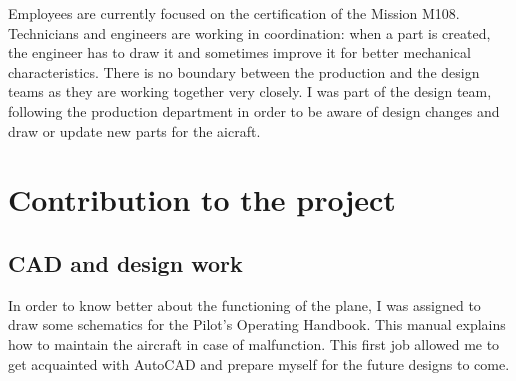 \documentclass[11pt,a4paper]{article}
\begin{document}
\bigskip

Employees are currently focused on the certification of the Mission M108. Technicians and engineers are working in coordination: when a part is created, the engineer has to draw it and sometimes improve it for better mechanical characteristics. There is no boundary between the production and the design teams as they are working together very closely. I was part of the design team, following the production department in order to be aware of design changes and draw or update new parts for the aicraft.

\newpage

\section{Contribution to the project}
\subsection{CAD and design work}

In order to know better about the functioning of the plane, I was assigned to draw some schematics for the Pilot's Operating Handbook. This manual explains how to maintain the aircraft in case of malfunction. This first job allowed me to get acquainted with AutoCAD and prepare myself for the future designs to come. 
\end{document}
